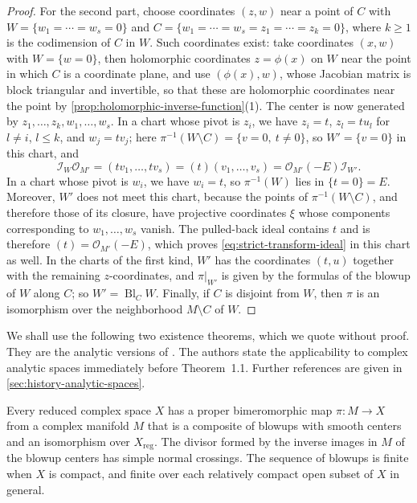 \begin{proof}
For the second part, choose coordinates $(z,w)$ near a point of $C$ with $W=\{w_1=\cdots=w_s=0\}$ and $C=\{w_1=\cdots=w_s=z_1=\cdots=z_k=0\}$, where $k\geq1$ is the codimension of $C$ in $W$. Such coordinates exist: take coordinates $(x,w)$ with $W=\{w=0\}$, then holomorphic coordinates $z=\phi(x)$ on $W$ near the point in which $C$ is a coordinate plane, and use $(\phi(x),w)$, whose Jacobian matrix is block triangular and invertible, so that these are holomorphic coordinates near the point by \cref{prop:holomorphic-inverse-function}(1). The center is now generated by $z_1,\ldots,z_k,w_1,\ldots,w_s$. In a chart whose pivot is $z_i$, we have $z_i=t$, $z_l=tu_l$ for $l\neq i$, $l\leq k$, and $w_j=tv_j$; here $\pi^{-1}(W\setminus C)=\{v=0,\ t\neq0\}$, so $W'=\{v=0\}$ in this chart, and
\[
 \mathcal I_W\mathcal O_{M'}=(tv_1,\ldots,tv_s)=(t)(v_1,\ldots,v_s)=\mathcal O_{M'}(-E)\mathcal I_{W'}.
\]
In a chart whose pivot is $w_i$, we have $w_i=t$, so $\pi^{-1}(W)$ lies in $\{t=0\}=E$. Moreover, $W'$ does not meet this chart, because the points of $\pi^{-1}(W\setminus C)$, and therefore those of its closure, have projective coordinates $\xi$ whose components corresponding to $w_1,\ldots,w_s$ vanish. The pulled-back ideal contains $t$ and is therefore $(t)=\mathcal O_{M'}(-E)$, which proves \eqref{eq:strict-transform-ideal} in this chart as well. In the charts of the first kind, $W'$ has the coordinates $(t,u)$ together with the remaining $z$-coordinates, and $\pi|_{W'}$ is given by the formulas of the blowup of $W$ along $C$; so $W'=\operatorname{Bl}_CW$. Finally, if $C$ is disjoint from $W$, then $\pi$ is an isomorphism over the neighborhood $M\setminus C$ of $W$.
\end{proof}

We shall use the following two existence theorems, which we quote without proof. They are the analytic versions of \cite[Theorems 1.1 and 1.3; Definitions 2.1--2.2]{BM08}. The authors state the applicability to complex analytic spaces immediately before Theorem~1.1. Further references are given in \cref{sec:history-analytic-spaces}.

\begin{theorem}\label{thm:analytic-resolution-input}
Every reduced complex space $X$ has a proper bimeromorphic map $\pi\colon M\to X$ from a complex manifold $M$ that is a composite of blowups with smooth centers and an isomorphism over $X_{\mathrm{reg}}$. The divisor formed by the inverse images in $M$ of the blowup centers has simple normal crossings. The sequence of blowups is finite when $X$ is compact, and finite over each relatively compact open subset of $X$ in general.
\end{theorem}

